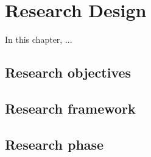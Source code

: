 \chapter[Research Design]{Research Design}
\label{Chap:ch3ResearchDesign}
\pagestyle{headings}

In this chapter, ...


\section{Research objectives}



\section{Research framework}



\section{Research phase}
